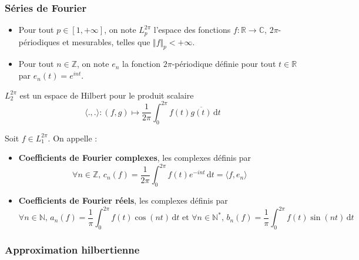 	\subsubsection{Séries de Fourier}


	\begin{notation}
		\begin{itemize}
			\item Pour tout $p \in [1, +\infty]$, on note $L_p^{2\pi}$ l'espace des fonctions $f : \mathbb{R} \rightarrow \mathbb{C}$, $2\pi$-périodiques et mesurables, telles que $\Vert f \Vert_p < +\infty$.
			\item Pour tout $n \in \mathbb{Z}$, on note $e_n$ la fonction $2\pi$-périodique définie pour tout $t \in \mathbb{R}$ par $e_n(t) = e^{int}$.
		\end{itemize}
	\end{notation}

	\begin{proposition}
		$L_2^{2\pi}$ est un espace de Hilbert pour le produit scalaire
		\[ \langle ., . \rangle : (f, g) \mapsto \frac{1}{2 \pi} \int_0^{2\pi} f(t) \overline{g(t)} \, \mathrm{d}t \]
	\end{proposition}


	\begin{definition}
		Soit $f \in L_1^{2\pi}$. On appelle :
		\begin{itemize}
			\item \textbf{Coefficients de Fourier complexes}, les complexes définis par
			\[ \forall n \in \mathbb{Z}, \, c_n(f) = \frac{1}{2 \pi} \int_0^{2\pi} f(t) e^{-int} \, \mathrm{d}t = \langle f, e_n \rangle \]
			\item \textbf{Coefficients de Fourier réels}, les complexes définis par
			\[ \forall n \in \mathbb{N}, \, a_n(f) = \frac{1}{\pi} \int_0^{2\pi} f(t) \cos(nt) \, \mathrm{d}t \text{ et } \forall n \in \mathbb{N}^*, \, b_n(f) = \frac{1}{\pi} \int_0^{2\pi} f(t) \sin(nt) \, \mathrm{d}t \]
		\end{itemize}
	\end{definition}

	\subsubsection{Approximation hilbertienne}


